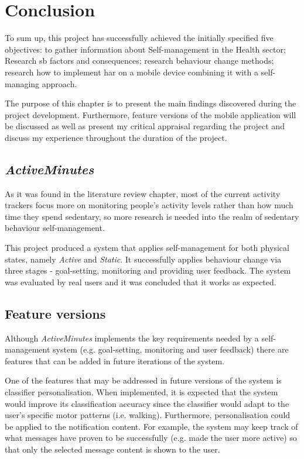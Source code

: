 \chapter{Conclusion}
To sum up, this project has successfully achieved the initially specified five objectives: to gather information about Self-management in the Health sector; Research \gls{sb} factors and consequences; research behaviour change methods; research how to implement \gls{har} on a mobile device combining it with a self-managing approach.

The purpose of this chapter is to present the main findings discovered during the project development. Furthermore, feature versions of the mobile application will be discussed as well as present my critical appraisal regarding the project and discuss my experience throughout the duration of the project. 

\section{\textit{ActiveMinutes}}
As it was found in the literature review chapter, most of the current activity trackers focus more on monitoring people's activity levels rather than how much time they spend sedentary, so more research is needed into the realm of sedentary behaviour self-management.

This project produced a system that applies self-management for both physical states, namely \textit{Active} and \textit{Static}. It successfully applies behaviour change via three stages - goal-setting, monitoring and providing user feedback. The system was evaluated by real users and it was concluded that it works as expected.

\section{Feature versions}
Although \textit{ActiveMinutes} implements the key requirements needed by a self-management system (e.g. goal-setting, monitoring and user feedback) there are features that can be added in future iterations of the system. 

One of the features that may be addressed in future versions of the system is classifier personalisation. When implemented, it is expected that the system would improve its classification accuracy since the classifier would adapt to the user's specific motor patterns (i.e. walking). Furthermore, personalisation could be applied to the notification content. For example, the system may keep track of what messages have proven to be successfully (e.g. made the user more active) so that only the selected message content is shown to the user.

